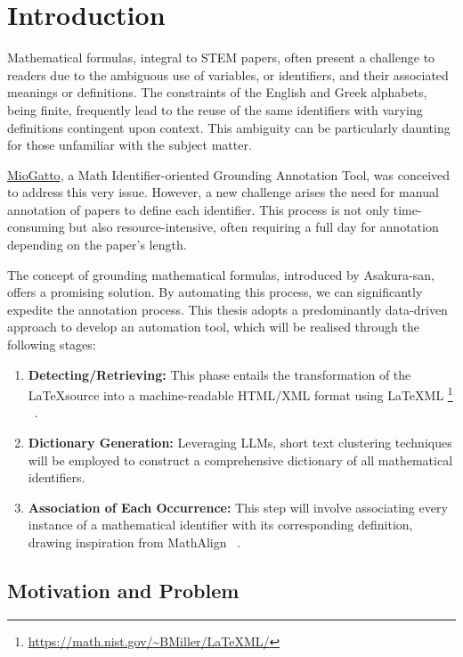 \chapter{Introduction}\label{chapter:introduction}

Mathematical formulas, integral to STEM papers, often present a challenge to readers due to the ambiguous use of variables, or identifiers, and their associated meanings or definitions. The constraints of the English and Greek alphabets, being finite, frequently lead to the reuse of the same identifiers with varying definitions contingent upon context. This ambiguity can be particularly daunting for those unfamiliar with the subject matter.

\href{https://github.com/wtsnjp/MioGatto/tree/main}{MioGatto}, a Math Identifier-oriented Grounding Annotation Tool, was conceived to address this very issue. However, a new challenge arises the need for manual annotation of papers to define each identifier. This process is not only time-consuming but also resource-intensive, often requiring a full day for annotation depending on the paper's length.

The concept of grounding mathematical formulas, introduced by Asakura-san, offers a promising solution. By automating this process, we can significantly expedite the annotation process. This thesis adopts a predominantly data-driven approach to develop an automation tool, which will be realised through the following stages:

\begin{enumerate}
    \item \textbf{Detecting/Retrieving:} This phase entails the transformation of the \LaTeX \space source into a machine-readable HTML/XML format using \LaTeX ML \footnote{\url{https://math.nist.gov/~BMiller/LaTeXML/}} ~\parencite{ginev2011latexml}.
    
    \item \textbf{Dictionary Generation:} Leveraging \ac{LLMs}, short text clustering techniques will be employed to construct a comprehensive dictionary of all mathematical identifiers.
    
    \item \textbf{Association of Each Occurrence:} This step will involve associating every instance of a mathematical identifier with its corresponding definition, drawing inspiration from MathAlign ~\parencite{alexeeva2020mathalign}.
\end{enumerate}


\section{Motivation and Problem}

